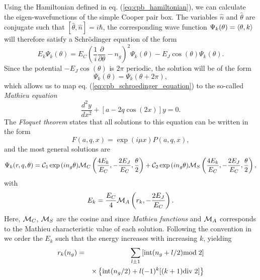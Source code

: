Using the Hamiltonian defined in eq. (\ref{eq:cpb_hamiltonian}), we can calculate the eigen-wavefunctions of the simple Cooper pair box. The variables $\hat{n}$ and $\hat{\theta}$ are conjugate such that $[\hat{\theta},\hat{n}]=i\hbar$, the corresponding wave function $\Psi_k(\theta) = \left< \theta,k \right>$ will therefore satisfy a Schrödinger equation of the form
%
\begin{equation}
E_k \Psi_k(\theta) = E_C(\frac{1}{i}\frac{\partial}{\partial \theta}-n_g)^2 \Psi_k(\theta) - E_J \cos{\left(\theta\right)}\Psi_k(\theta). \label{eq:cpb_schroedinger_equation}
\end{equation}
%
Since the potential $-E_J\cos{(\theta)}$ is $2\pi$ periodic, the solution will be of the form
%
\begin{equation}
\Psi_k(\theta) = \Psi_k(\theta+2\pi),
\end{equation}
%
which allows us to map eq. (\ref{eq:cpb_schroedinger_equation}) to the so-called {\it Mathieu  equation}
%
\begin{equation}
\frac{d^2y}{dx^2}+\left[a-2q\cos{(2x)}\right]y = 0.
\end{equation}
%
The {\it Floquet theorem} states that all solutions to this equation can be written in the form
%
\begin{equation}
F(a,q,x) = \exp{\left(i\mu x\right)}P(a,q,x),
\end{equation}
%
and the most general solutions are \citep{cottet_implementation_2002}
%
\begin{equation}
\Psi_k(r,q,\theta) = \mcal{C}_1\exp{\left(i n_g \theta \right)}\mcal{M}_C\left(\frac{4E_k}{E_C},-\frac{2E_J}{E_C},\frac{\theta}{2}\right)+\mcal{C}_2\exp{\left(i n_g \theta \right)}\mcal{M}_S \left(\frac{4 E_k}{E_C},-\frac{2 E_J}{E_C},\frac{\theta}{2}\right),
\end{equation}
%
with 
%
\begin{equation}
E_k = \frac{E_C}{4}\mcal{M}_A \left(r_k,-\frac{2 E_J}{E_C} \right).
\end{equation}
%
Here, $\mcal{M}_C$, $\mcal{M}_S$ are the cosine and since {\it Mathieu functions} and $\mcal{M}_A$ corresponds to the Mathieu characteristic value of each solution. Following the convention in \citep{cottet_implementation_2002} we order the $E_k$ such that the energy increases with increasing $k$, yielding \citep{koch_charge-insensitive_2007}
%
\begin{eqnarray}
r_k(n_g) & = & \sum\limits_{l\pm 1}\left[\mathrm{int}(n_g+l/2)\mathrm{mod}\;2\right] \notag \\
&  & \times\left\{\mathrm{int}(n_g/2)+l(-1)^k[(k+1)\mathrm{div}\;2]\right\}
\end{eqnarray}
%

